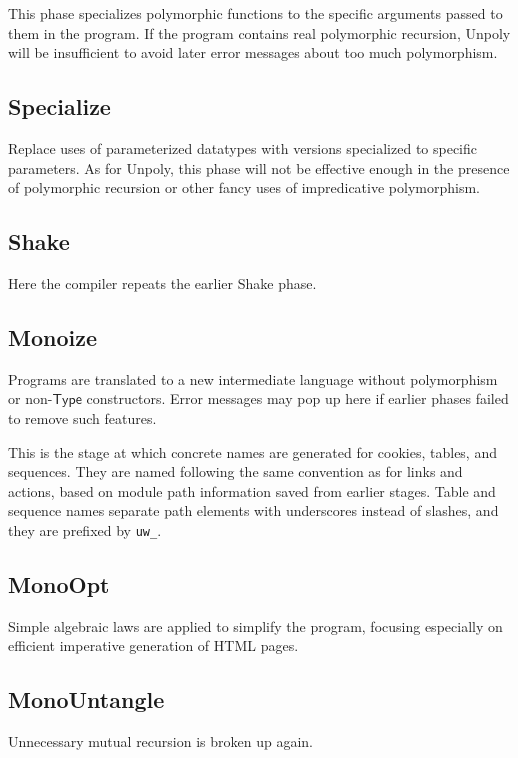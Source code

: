 \documentclass{article}
\newcommand{\mt}[1]{\mathsf{#1}}
\begin{document}
This phase specializes polymorphic functions to the specific arguments passed to them in the program.  If the program contains real polymorphic recursion, Unpoly will be insufficient to avoid later error messages about too much polymorphism.

\subsection{Specialize}

Replace uses of parameterized datatypes with versions specialized to specific parameters.  As for Unpoly, this phase will not be effective enough in the presence of polymorphic recursion or other fancy uses of impredicative polymorphism.

\subsection{Shake}

Here the compiler repeats the earlier Shake phase.

\subsection{Monoize}

Programs are translated to a new intermediate language without polymorphism or non-$\mt{Type}$ constructors.  Error messages may pop up here if earlier phases failed to remove such features.

This is the stage at which concrete names are generated for cookies, tables, and sequences.  They are named following the same convention as for links and actions, based on module path information saved from earlier stages.  Table and sequence names separate path elements with underscores instead of slashes, and they are prefixed by \texttt{uw\_}.

\subsection{MonoOpt}

Simple algebraic laws are applied to simplify the program, focusing especially on efficient imperative generation of HTML pages.

\subsection{MonoUntangle}

Unnecessary mutual recursion is broken up again.
\end{document}
